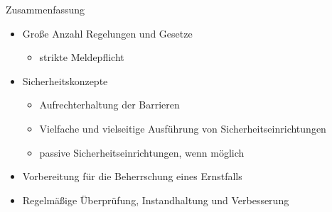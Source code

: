 \begin{frame}{Zusammenfassung}
	\large
	\begin{itemize}
		\item{Große Anzahl Regelungen und Gesetze}
		\begin{itemize}
			\item{strikte Meldepflicht}
		\end{itemize}
		\item{Sicherheitskonzepte}
		\begin{itemize}
			\item{Aufrechterhaltung der Barrieren}
			\item{Vielfache und vielseitige Ausführung von Sicherheitseinrichtungen}
			\item{passive Sicherheitseinrichtungen, wenn möglich}
		\end{itemize}
		\item{Vorbereitung für die Beherrschung eines Ernstfalls}
		\item{Regelmäßige Überprüfung, Instandhaltung und Verbesserung}
	\end{itemize}
\end{frame}